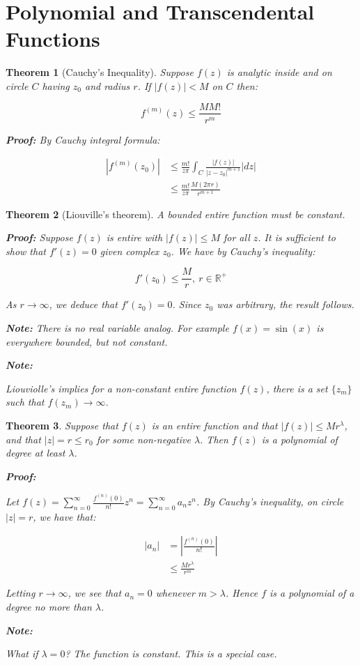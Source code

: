 \documentclass{article}
\newtheorem{theorem}{Theorem}[section]
\theoremstyle{definition}
\def\R{\mathbb{R}}
\begin{document}

\section{Polynomial and Transcendental Functions }
\begin{theorem}[Cauchy's Inequality]
Suppose $f(z)$ is analytic inside and on circle $C$ having $z_0$ and radius $r$. If $|f(z)|<M$ on $C$ then:

$$f^{(m)}(z) \leq \frac{MM!}{r^m}$$

\textbf{Proof:}
By Cauchy integral formula:

\begin{align}
\left|f^{(m)}(z_0)\right| &\leq \frac{m!}{z\pi} \int_{C} \frac{|f(z)|}{|z-z_0|^{m+1}} |dz| \\ 
& \leq \frac{m!}{z\pi}\frac{M(2\pi r)}{r^{m+1}}
\end{align}
\end{theorem}

\begin{theorem}[Liouville's theorem]
A bounded entire function must be constant.

\textbf{Proof:}
Suppose $f(z)$ is entire with $|f(z)| \leq M$ for all $z$. It is sufficient to show that $f'(z) = 0$ given complex $z_0$. We have by Cauchy's inequality:

$$f'(z_0) \leq \frac{M}{r},\ r \in \R^+$$

As $r \to \infty$, we deduce that $f'(z_0) = 0$. Since $z_0$ was arbitrary, the result follows.

\textbf{Note:}
There is no real variable analog. For example $f(x) = \sin(x)$ is everywhere bounded, but not constant. 

\textbf{Note:}

Liouviolle's implies for a non-constant entire function $f(z)$, there is a set $\{z_m\}$ such that $f(z_m) \to \infty$. 


\end{theorem}

\begin{theorem}
Suppose that $f(z)$ is an entire function and that $|f(z)| \leq Mr^\lambda$, and that $|z| = r \leq r_0$ for some non-negative $\lambda$. Then $f(z)$ is a polynomial of degree at least $\lambda$. 

\textbf{Proof:}

Let $f(z) = \sum_{n=0}^\infty \frac{f^{(n)}(0)}{n!} z^n = \sum_{n=0}^\infty a_n z^n$. By Cauchy's inequality, on circle $|z|=r$, we have that:

\begin{align}
|a_n| &= \left|\frac{f^{(n)}(0)}{n!}\right| \\
& \leq \frac{Mr^\lambda}{r^m}
\end{align}

Letting $r \to \infty$, we see that $a_n = 0$ whenever $m>\lambda$. Hence $f$ is a polynomial of a degree no more than $\lambda$.

\textbf{Note:}

What if $\lambda = 0$? The function is constant. This is a special case.
\end{theorem}
\end{document}
